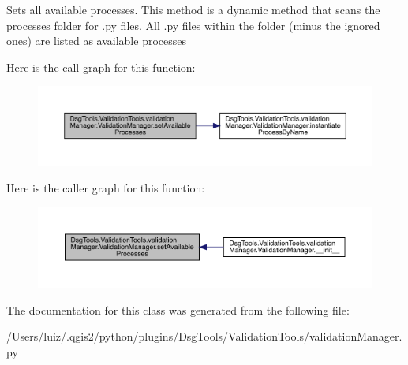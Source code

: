 \begin{DoxyVerb}Sets all available processes.
This method is a dynamic method that scans the processes folder for .py files.
All .py files within the folder (minus the ignored ones) are listed as available processes
\end{DoxyVerb}
 Here is the call graph for this function\+:
\nopagebreak
\begin{figure}[H]
\begin{center}
\leavevmode
\includegraphics[width=350pt]{class_dsg_tools_1_1_validation_tools_1_1validation_manager_1_1_validation_manager_a6e35072e219132f123b62f26620097e5_cgraph}
\end{center}
\end{figure}
Here is the caller graph for this function\+:
\nopagebreak
\begin{figure}[H]
\begin{center}
\leavevmode
\includegraphics[width=350pt]{class_dsg_tools_1_1_validation_tools_1_1validation_manager_1_1_validation_manager_a6e35072e219132f123b62f26620097e5_icgraph}
\end{center}
\end{figure}


The documentation for this class was generated from the following file\+:\begin{DoxyCompactItemize}
\item 
/\+Users/luiz/.\+qgis2/python/plugins/\+Dsg\+Tools/\+Validation\+Tools/validation\+Manager.\+py\end{DoxyCompactItemize}
